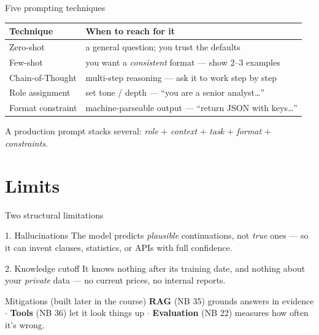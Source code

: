 \documentclass[aspectratio=169,11pt]{beamer}
\begin{document}
\begin{frame}{Five prompting techniques}
  \small
  \begin{center}
  \begin{tabular}{lp{7.0cm}}
    \toprule
    \textbf{Technique} & \textbf{When to reach for it} \\
    \midrule
    Zero-shot          & a general question; you trust the defaults \\
    Few-shot           & you want a \emph{consistent} format --- show 2--3 examples \\
    Chain-of-Thought   & multi-step reasoning --- ask it to work step by step \\
    Role assignment    & set tone / depth --- ``you are a senior analyst\ldots'' \\
    Format constraint  & machine-parseable output --- ``return JSON with keys\ldots'' \\
    \bottomrule
  \end{tabular}
  \end{center}
  {\footnotesize A production prompt stacks several: \emph{role} $+$ \emph{context} $+$ \emph{task} $+$ \emph{format} $+$ \emph{constraints}.}
\end{frame}

\section{Limits}
\begin{frame}{Two structural limitations}
  \begin{alertblock}{1. Hallucinations}
    The model predicts \emph{plausible} continuations, not \emph{true} ones --- so it can invent clauses, statistics, or APIs with full confidence.
  \end{alertblock}
  \begin{alertblock}{2. Knowledge cutoff}
    It knows nothing after its training date, and nothing about your \emph{private} data --- no current prices, no internal reports.
  \end{alertblock}
  \begin{exampleblock}{Mitigations (built later in the course)}
    \textbf{RAG} (NB 35) grounds answers in evidence $\cdot$ \textbf{Tools} (NB 36) let it look things up $\cdot$ \textbf{Evaluation} (NB 22) measures how often it's wrong.
  \end{exampleblock}
\end{frame}
\end{document}
